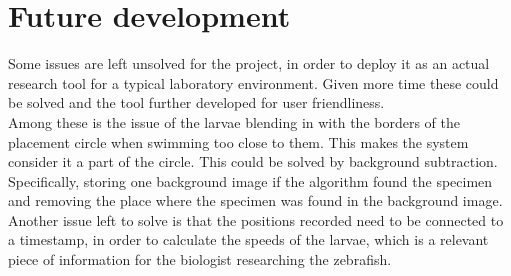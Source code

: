 \documentclass[10pt,a4paper, singlespace]{article}
\begin{document}
\section{Future development}
Some issues are left unsolved for the project, in order to deploy it as an actual research tool for a typical laboratory environment. Given more time these could be solved and the tool further developed for user friendliness.\\ 
Among these is the issue of the larvae blending in with the borders of the placement circle when swimming too close to them. This makes the system consider it a part of the circle. This could be solved by background subtraction. Specifically, storing one background image if the algorithm found the specimen and removing the place where the specimen was found in the background image.\\
Another issue left to solve is that the positions recorded need to be connected to a timestamp, in order to calculate the speeds of the larvae, which is a relevant piece of information for the biologist researching the zebrafish.   
\end{document}
